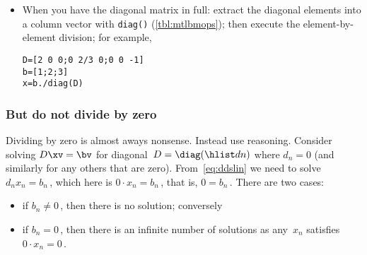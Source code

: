 \begin{compute}
\begin{itemize}
\item When you have the diagonal matrix in full:  extract the diagonal elements into a column vector with \verb|diag()| (\autoref{tbl:mtlbmops});  then execute the element-by-element division; for example,
\setbox\ajrqrbox\hbox{}%
\marginpar{\usebox{\ajrqrbox\\[2ex]}}%
\begin{verbatim}
D=[2 0 0;0 2/3 0;0 0 -1]
b=[1;2;3]
x=b./diag(D)
\end{verbatim}
\end{itemize}

\end{compute}


\subsubsection{But do not divide by zero} 
Dividing by zero is almost aways nonsense.
Instead use reasoning.
Consider solving \(D\xv=\bv\) for diagonal~\(D=\diag(\hlist dn)\) where \(d_n=0\) (and similarly for any others that are zero).
From~\eqref{eq:ddslin} we need to solve \(d_nx_n=b_n\)\,, which here is \(0\cdot x_n=b_n\)\,, that is, \(0=b_n\)\,. 
There are two cases: 
\begin{itemize}
\item if \(b_n\neq 0\)\,, then there is no solution; conversely
\item if \(b_n=0\)\,, then there is an infinite number of solutions as any~\(x_n\) satisfies \(0\cdot x_n=0\)\,.
\end{itemize}





